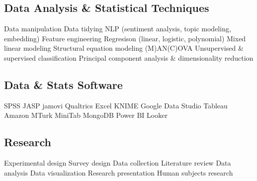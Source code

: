 \documentclass[letterpaper]{deedy-resume_sm} %
\begin{document}
\subsection{Data Analysis \& Statistical Techniques}
Data manipulation \textbullet{} Data tidying \textbullet{} NLP (sentiment analysis, topic modeling, embedding) \textbullet{} Feature engineering \textbullet{} Regresison (linear, logistic, polynomial) \textbullet{} Mixed linear modeling \textbullet{} Structural equation modeling \textbullet{} (M)AN(C)OVA \textbullet{} Unsupervised \& supervised classification \textbullet{} Principal component analysis \& dimensionality reduction\\
\subsection{Data \& Stats Software}
SPSS \textbullet{} JASP \textbullet{} jamovi \textbullet{} Qualtrics \textbullet{} Excel \textbullet{} KNIME \textbullet{} Google Data Studio \textbullet{} Tableau \textbullet{} Amazon MTurk \textbullet{} MiniTab \textbullet{} MongoDB \textbullet{} Power BI \textbullet{} Looker
\subsection{Research}
Experimental design \textbullet{} Survey design \textbullet{} Data collection \textbullet{} Literature review \textbullet{} Data analysis \textbullet{} Data visualization \textbullet{} Research presentation \textbullet{} Human subjects research %

\end{document}
